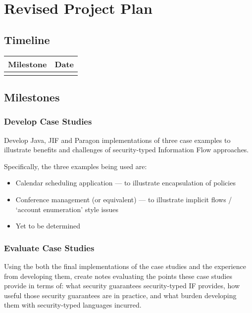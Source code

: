 \section*{Revised Project Plan}

\subsection*{Timeline}

\begin{tabular}{r|l}
	Milestone & Date \\\hline\\
\end{tabular}

\subsection*{Milestones}

\subsubsection*{Develop Case Studies}

Develop Java, JIF and Paragon implementations of three case examples to illustrate benefits and challenges of security-typed Information Flow approaches.

Specifically, the three examples being used are:

\begin{itemize}
	\item Calendar scheduling application --- to illustrate encapsulation of policies
	
	\item Conference management (or equivalent) --- to illustrate implicit flows / `account enumeration' style issues
	
	\item Yet to be determined
\end{itemize}

\subsubsection*{Evaluate Case Studies}

Using the both the final implementations of the case studies and the experience from developing them, create notes evaluating the points these case studies provide in terms of: what security guarantees security-typed IF provides, how useful those security guarantees are in practice, and what burden developing them with security-typed languages incurred.

